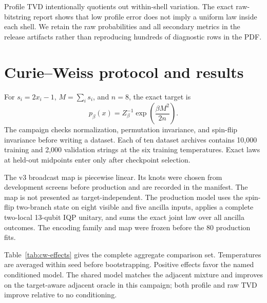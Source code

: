 Profile TVD intentionally quotients out within-shell variation. The exact
raw-bitstring report shows that low profile error does not imply a uniform law
inside each shell. We retain the raw probabilities and all secondary metrics in
the release artifacts rather than reproducing hundreds of diagnostic rows in
the PDF.

\section{Curie--Weiss protocol and results}
\label{app:curie-protocol}

For $s_i=2x_i-1$, $M=\sum_i s_i$, and $n=8$, the exact target is
\begin{equation}
 p_\beta(x)=Z_\beta^{-1}\exp\!\left(\frac{\beta M^2}{2n}\right).
\end{equation}
The campaign checks normalization, permutation invariance, and spin-flip
invariance before writing a dataset. Each of ten dataset archives contains
10,000 training and 2,000 validation strings at the six training
temperatures. Exact laws at held-out midpoints enter only after checkpoint
selection.

The v3 broadcast map is piecewise linear. Its knots were chosen from
development screens before production and are recorded in the manifest. The
map is not presented as target-independent. The production model uses the
spin-flip two-branch state on eight visible and five ancilla inputs, applies a
complete two-local 13-qubit IQP unitary, and sums the exact joint law over all
ancilla outcomes. The encoding family and map were frozen before the 80
production fits.

Table~\ref{tab:cw-effects} gives the complete aggregate comparison set.
Temperatures are averaged within seed before bootstrapping. Positive effects
favor the named conditioned model. The shared model matches the adjacent
mixture and improves on the target-aware adjacent oracle in this campaign;
both profile and raw TVD improve relative to no conditioning.

\begin{table}[t]
\centering
\scriptsize
\caption{All paired Curie--Weiss v3 effects.}
\label{tab:cw-effects}
\end{table}

